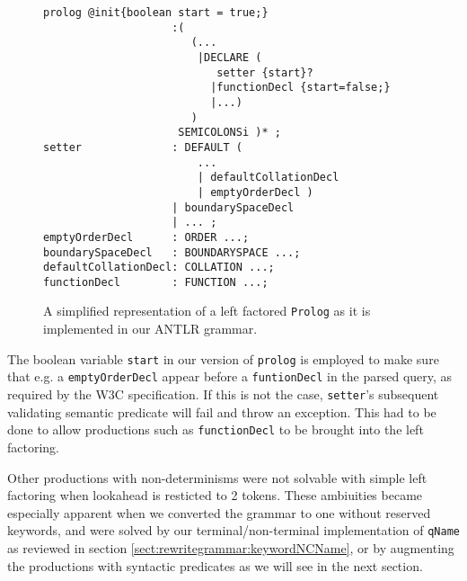 \begin{figure}[h!]
\begin{verbatim}
prolog @init{boolean start = true;}
                    :(
                       (...
                        |DECLARE (
                           setter {start}?
                          |functionDecl {start=false;}
                          |...)
                       )
                     SEMICOLONSi )* ;
setter              : DEFAULT (
                        ...
                        | defaultCollationDecl
                        | emptyOrderDecl )
                    | boundarySpaceDecl
                    | ... ;
emptyOrderDecl      : ORDER ...;
boundarySpaceDecl   : BOUNDARYSPACE ...;
defaultCollationDecl: COLLATION ...;
functionDecl        : FUNCTION ...;
\end{verbatim}
\label{fig:antlrFactored}
\caption[\texttt{Prolog} left factored.]{A simplified representation of a left factored \texttt{Prolog} as it is implemented in our ANTLR grammar.}
\end{figure}

The boolean variable \verb!start! in our version of \verb!prolog! is employed to make sure that e.g. a \verb!emptyOrderDecl! appear before a \verb!funtionDecl! in the parsed query, as required by the W3C specification. If this is not the case, \verb!setter!'s subsequent validating semantic predicate will fail and throw an exception. This had to be done to allow productions such as \verb!functionDecl! to be brought into the left factoring.

Other productions with non-determinisms were not solvable with simple left factoring when lookahead is resticted to 2 tokens. These ambiuities became especially apparent when we converted the grammar to one without reserved keywords, and were solved by our terminal/non-terminal implementation of \verb!qName! as reviewed in section \ref{sect:rewritegrammar:keywordNCName}, or by augmenting the productions with syntactic predicates as we will see in the next section.
